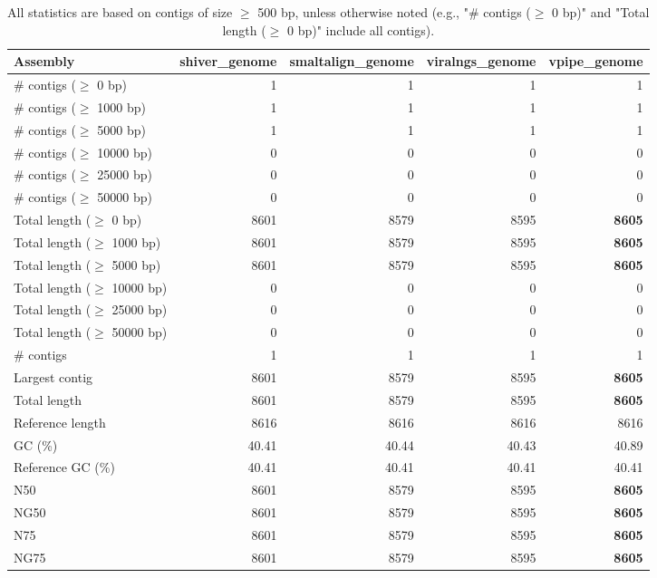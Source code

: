 \documentclass[12pt,a4paper]{article}
\begin{document}
\begin{table}[ht]
\begin{center}
\caption{All statistics are based on contigs of size $\geq$ 500 bp, unless otherwise noted (e.g., "\# contigs ($\geq$ 0 bp)" and "Total length ($\geq$ 0 bp)" include all contigs).}
\begin{tabular}{|l*{4}{|r}|}
\hline
Assembly & shiver\_genome & smaltalign\_genome & viralngs\_genome & vpipe\_genome \\ \hline
\# contigs ($\geq$ 0 bp) & 1 & 1 & 1 & 1 \\ \hline
\# contigs ($\geq$ 1000 bp) & 1 & 1 & 1 & 1 \\ \hline
\# contigs ($\geq$ 5000 bp) & 1 & 1 & 1 & 1 \\ \hline
\# contigs ($\geq$ 10000 bp) & 0 & 0 & 0 & 0 \\ \hline
\# contigs ($\geq$ 25000 bp) & 0 & 0 & 0 & 0 \\ \hline
\# contigs ($\geq$ 50000 bp) & 0 & 0 & 0 & 0 \\ \hline
Total length ($\geq$ 0 bp) & 8601 & 8579 & 8595 & {\bf 8605} \\ \hline
Total length ($\geq$ 1000 bp) & 8601 & 8579 & 8595 & {\bf 8605} \\ \hline
Total length ($\geq$ 5000 bp) & 8601 & 8579 & 8595 & {\bf 8605} \\ \hline
Total length ($\geq$ 10000 bp) & 0 & 0 & 0 & 0 \\ \hline
Total length ($\geq$ 25000 bp) & 0 & 0 & 0 & 0 \\ \hline
Total length ($\geq$ 50000 bp) & 0 & 0 & 0 & 0 \\ \hline
\# contigs & 1 & 1 & 1 & 1 \\ \hline
Largest contig & 8601 & 8579 & 8595 & {\bf 8605} \\ \hline
Total length & 8601 & 8579 & 8595 & {\bf 8605} \\ \hline
Reference length & 8616 & 8616 & 8616 & 8616 \\ \hline
GC (\%) & 40.41 & 40.44 & 40.43 & 40.89 \\ \hline
Reference GC (\%) & 40.41 & 40.41 & 40.41 & 40.41 \\ \hline
N50 & 8601 & 8579 & 8595 & {\bf 8605} \\ \hline
NG50 & 8601 & 8579 & 8595 & {\bf 8605} \\ \hline
N75 & 8601 & 8579 & 8595 & {\bf 8605} \\ \hline
NG75 & 8601 & 8579 & 8595 & {\bf 8605} \\ \hline

\end{tabular}
\end{center}
\end{table}
\end{document}
